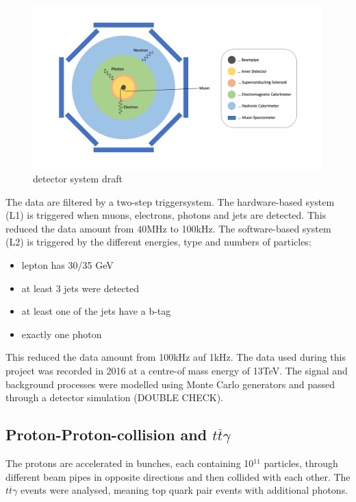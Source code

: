 \documentclass[11pt]{scrartcl}
\begin{document}
	\begin{figure}[H]
	\centering
	\includegraphics[width=1\textwidth]{figures/detector_system.png}
	\caption{detector system draft}
	\label{fig:detectorsystem}
	\end{figure}
	
	The data are filtered by a two-step triggersystem. The hardware-based system (L1) is triggered when muons, electrons, photons and jets are detected. This reduced the data amount from 40MHz to 100kHz. The software-based system (L2) is triggered by the different energies, type and numbers of particles:
	
\begin{itemize}
  \item lepton has 30/35 GeV
  \item at least 3 jets were detected
  \item at least one of the jets have a b-tag
  \item exactly one photon
\end{itemize}

This reduced the data amount from 100kHz auf 1kHz. The data used during this project was recorded in 2016 at a centre-of mass energy of 13TeV. The signal and background processes were modelled using Monte Carlo generators and passed through a detector simulation (DOUBLE CHECK). 

	\subsection{Proton-Proton-collision and $t\overline{t}\gamma$}
	The protons are accelerated in bunches, each containing 10$^{11}$ particles, through different beam pipes in opposite directions and then collided with each other. The $t\overline{t}\gamma$ events were analysed, meaning top quark pair events with additional photons.
	
\end{document}
